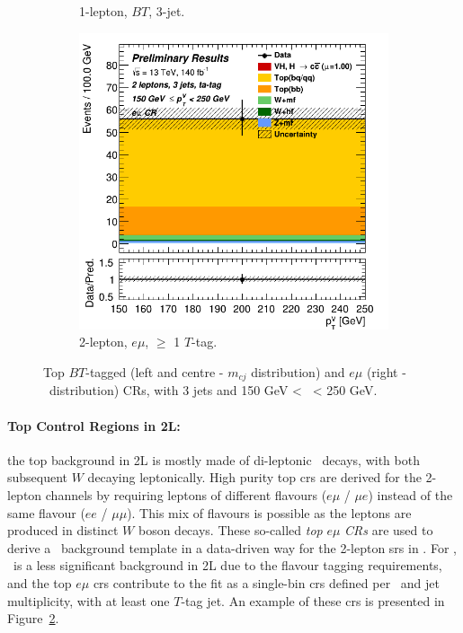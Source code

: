 \begin{figure}[h!]
\begin{subfigure}[b]{0.32\textwidth}
      \caption{1-lepton, $BT$, 3-jet.}
      \label{fig:plots_VHcc_ex_1L_TopCR}
  \end{subfigure}
  \begin{subfigure}[b]{0.32\textwidth}
    \centering
    \includegraphics[width=\textwidth]{Images/VH/Own_fit/prefit_VHcc/Region_distpTV_BMax250_BMin150_Dtopemucr_J3_TTypeta_T2_L2_Y6051_Prefit.png}
    \caption{2-lepton, $e\mu$, $\geq$ 1 $T$-tag.}
    \label{fig:plots_VHcc_ex_2L_TopCR}
\end{subfigure}
  \caption{Top $BT$-tagged (left and centre - $m_{cj}$ distribution) and $e\mu$ (right - \ptv\ distribution) CRs, with 3 jets and 150 GeV < \ptv\ < 250 GeV.}
  \label{fig:plots_VHcc_ex_TopCR}
\end{figure} 

\paragraph{Top Control Regions in 2L:} the top background in 2L is mostly made of di-leptonic \ttb\ decays, with both subsequent $W$ decaying leptonically. High purity top \glspl{cr} are derived for the 2-lepton channels by requiring leptons of different flavours ($e\mu$ / $\mu e$) instead of the same flavour ($ee$ / $\mu\mu$). This mix of flavours is possible as the leptons are produced in distinct $W$ boson decays. These so-called \textit{top} $e\mu$ \textit{CRs} are used to derive a \ttb\ background template in a data-driven way for the 2-lepton \glspl{sr} in \vhb. For \vhc, \ttb\ is a less significant background in 2L due to the flavour tagging requirements, and the top $e\mu$ \glspl{cr} contribute to the fit as a single-bin \glspl{cr} defined per \ptv\ and jet multiplicity, with at least one $T$-tag jet. An example of these \glspl{cr} is presented in Figure~\ref{fig:plots_VHcc_ex_2L_TopCR}.

